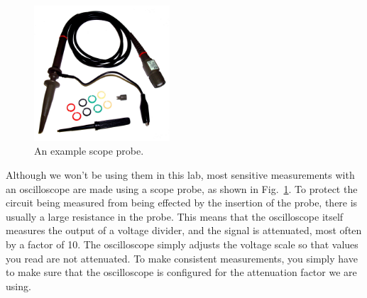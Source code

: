 \begin{figure}[htbp]
\begin{center}
\includegraphics[width=0.45\textwidth]{figs/labs/lissajous/probe.jpg} 
\caption{An example scope probe.}
\label{fig:probe}
\end{center}
\end{figure}

Although we won't be using them in this lab, most sensitive
measurements with an oscilloscope are made using a scope probe, as
shown in Fig.~\ref{fig:probe}.  To protect the circuit being measured
from being effected by the insertion of the probe, there is usually a
large resistance in the probe.  This means that the oscilloscope
itself measures the output of a voltage divider, and the signal is
attenuated, most often by a factor of 10.  The oscilloscope simply
adjusts the voltage scale so that values you read are not attenuated.
To make consistent measurements, you simply have to make sure that the
oscilloscope is configured for the attenuation factor we are using.

